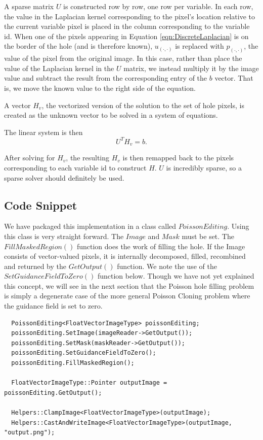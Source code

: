 \documentclass{InsightArticle}
\begin{document}
A sparse matrix $U$ is constructed row by row, one row per variable. In each row, the value in the Laplacian kernel corresponding to the pixel's location relative to the current variable pixel is placed in the column corresponding to the variable id. When one of the pixels appearing in Equation \ref{eqn:DiscreteLaplacian} is on the border of the hole (and is therefore known), $u_{(\cdot,\cdot)}$ is replaced with $p_{(\cdot,\cdot)}$, the value of the pixel from the original image. In this case, rather than place the value of the Laplacian kernel in the $U$ matrix, we instead multiply it by the image value and subtract the result from the corresponding entry of the $b$ vector. That is, we move the known value to the right side of the equation.

A vector $H_v$, the vectorized version of the solution to the set of hole pixels, is created as the unknown vector to be solved in a system of equations.

The linear system is then
\begin{equation}
 U^T H_v = b.
\end{equation}

After solving for $H_v$, the resulting $H_v$ is then remapped back to the pixels corresponding to each variable id to construct $H$. $U$ is incredibly sparse, so a sparse solver should definitely be used.

\subsection{Code Snippet}
We have packaged this implementation in a class called $PoissonEditing$. Using this class is very straight forward. The $Image$ and $Mask$ must be set. The $FillMaskedRegion()$ function does the work of filling the hole. If the Image consists of vector-valued pixels, it is internally decomposed, filled, recombined and returned by the $GetOutput()$ function. We note the use of the $SetGuidanceFieldToZero()$ function below. Though we have not yet explained this concept, we will see in the next section that the Poisson hole filling problem is simply a degenerate case of the more general Poisson Cloning problem where the guidance field is set to zero.

\begin{verbatim}
  PoissonEditing<FloatVectorImageType> poissonEditing;
  poissonEditing.SetImage(imageReader->GetOutput());
  poissonEditing.SetMask(maskReader->GetOutput());
  poissonEditing.SetGuidanceFieldToZero();
  poissonEditing.FillMaskedRegion();

  FloatVectorImageType::Pointer outputImage = poissonEditing.GetOutput();

  Helpers::ClampImage<FloatVectorImageType>(outputImage);
  Helpers::CastAndWriteImage<FloatVectorImageType>(outputImage, "output.png");
\end{verbatim}
\end{document}
